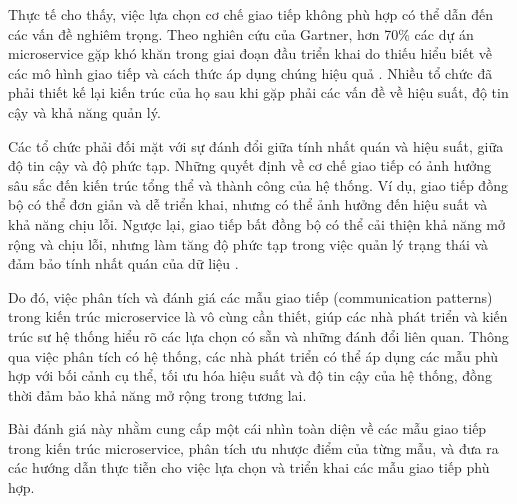 Thực tế cho thấy, việc lựa chọn cơ chế giao tiếp không phù hợp có thể dẫn đến
các vấn đề nghiêm trọng. Theo nghiên cứu của Gartner, hơn 70\% các dự án
microservice gặp khó khăn trong giai đoạn đầu triển khai do thiếu hiểu biết về
các mô hình giao tiếp và cách thức áp dụng chúng hiệu quả \cite{gartner2019}. Nhiều tổ chức đã
phải thiết kế lại kiến trúc của họ sau khi gặp phải các vấn đề về hiệu suất, độ
tin cậy và khả năng quản lý.

Các tổ chức phải đối mặt với sự đánh đổi giữa tính nhất quán và hiệu suất, giữa
độ tin cậy và độ phức tạp. Những quyết định về cơ chế giao tiếp có ảnh hưởng
sâu sắc đến kiến trúc tổng thể và thành công của hệ thống. Ví dụ, giao tiếp
đồng bộ có thể đơn giản và dễ triển khai, nhưng có thể ảnh hưởng đến hiệu suất
và khả năng chịu lỗi. Ngược lại, giao tiếp bất đồng bộ có thể cải thiện khả
năng mở rộng và chịu lỗi, nhưng làm tăng độ phức tạp trong việc quản lý trạng
thái và đảm bảo tính nhất quán của dữ liệu \cite{newman2015}.

Do đó, việc phân tích và đánh giá các mẫu giao tiếp (communication patterns)
trong kiến trúc microservice là vô cùng cần thiết, giúp các nhà phát triển và
kiến trúc sư hệ thống hiểu rõ các lựa chọn có sẵn và những đánh đổi liên quan.
Thông qua việc phân tích có hệ thống, các nhà phát triển có thể áp dụng các mẫu
phù hợp với bối cảnh cụ thể, tối ưu hóa hiệu suất và độ tin cậy của hệ thống,
đồng thời đảm bảo khả năng mở rộng trong tương lai.

Bài đánh giá này nhằm cung cấp một cái nhìn toàn diện về các mẫu giao tiếp
trong kiến trúc microservice, phân tích ưu nhược điểm của từng mẫu, và đưa ra
các hướng dẫn thực tiễn cho việc lựa chọn và triển khai các mẫu giao tiếp phù
hợp.

